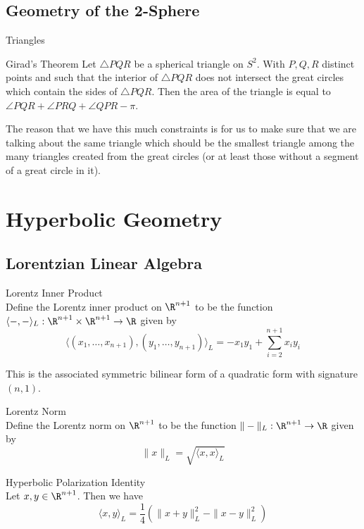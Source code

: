 \documentclass[a4paper]{article}
\begin{document}
\subsection{Geometry of the 2-Sphere}
\begin{defn}{Triangles}{}
\end{defn}

\begin{thm}{Girad's Theorem}{} Let $\triangle PQR$ be a spherical triangle on $S^2$. With $P,Q,R$ distinct points and such that the interior of $\triangle PQR$ does not intersect the great circles which contain the sides of $\triangle PQR$. Then the area of the triangle is equal to $\angle PQR+\angle PRQ+\angle QPR-\pi$. 
\end{thm}

The reason that we have this much constraints is for us to make sure that we are talking about the same triangle which should be the smallest triangle among the many triangles created from the great circles (or at least those without a segment of a great circle in it). 

\pagebreak
\section{Hyperbolic Geometry}
\subsection{Lorentzian Linear Algebra}
\begin{defn}{Lorentz Inner Product}{}\\
Define the Lorentz inner product on $\R^{n+1}$ to be the function $\langle-,-\rangle_L:\R^{n+1}\times\R^{n+1}\to\R$ given by $$\langle(x_1,\dots,x_{n+1}),(y_1,\dots,y_{n+1})\rangle_L=-x_1y_1+\sum_{i=2}^{n+1}x_iy_i$$
\end{defn}

This is the associated symmetric bilinear form of a quadratic form with signature $(n,1)$. 

\begin{defn}{Lorentz Norm}{}\\
Define the Lorentz norm on $\R^{n+1}$ to be the function $\|-\|_L:\R^{n+1}\to\R$ given by $$\|x\|_L=\sqrt{\langle x,x\rangle_L}$$
\end{defn}

\begin{lmm}{Hyperbolic Polarization Identity}{}\\
Let $x,y\in\R^{n+1}$. Then we have $$\langle x,y\rangle_L=\frac{1}{4}\left(\|x+y\|_L^2-\|x-y\|_L^2\right)$$
\end{lmm}
\end{document}
